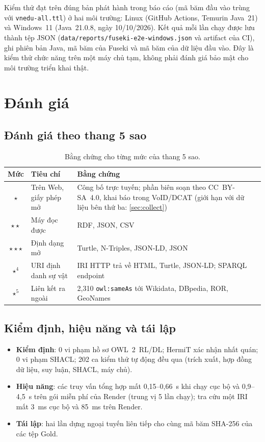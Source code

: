 \documentclass[12pt,a4paper]{article}
\begin{document}
Kiểm thử đạt trên đúng bản phát hành trong báo cáo (mã băm đầu vào trùng với \texttt{vnedu-all.ttl}) ở hai môi trường:
Linux (GitHub Actions, Temurin Java~21) và Windows~11 (Java~21.0.8, ngày 10/10/2026). Kết quả mỗi lần chạy được lưu thành
tệp JSON (\texttt{data/reports/fuseki-e2e-windows.json} và artifact của CI), ghi phiên bản Java, mã băm của Fuseki và mã
băm của dữ liệu đầu vào. Đây là kiểm thử chức năng trên một máy chủ tạm, không phải đánh giá bảo mật cho môi trường
triển khai thật.

\section{Đánh giá}\label{sec:eval}

\subsection{Đánh giá theo thang 5 sao}
\begin{table}[htbp]
\centering\small
\caption{Bằng chứng cho từng mức của thang 5 sao.}\label{tab:5star}
\begin{tabularx}{\textwidth}{c>{\raggedright\arraybackslash}p{3.4cm}X}
\toprule
Mức & Tiêu chí & Bằng chứng \\
\midrule
\(\star\) & Trên Web, giấy phép mở & Công bố trực tuyến; phần biên soạn theo CC~BY-SA~4.0, khai báo trong VoID/DCAT
(giới hạn với dữ liệu bên thứ ba: \cref{sec:collect}) \\
\(\star\star\) & Máy đọc được & RDF, JSON, CSV \\
\(\star\star\star\) & Định dạng mở & Turtle, N-Triples, JSON-LD, JSON \\
\(\star^4\) & URI định danh sự vật & \metricLocalResources{} IRI HTTP trả về HTML, Turtle, JSON-LD; SPARQL endpoint \\
\(\star^5\) & Liên kết ra ngoài & 2{,}310 \texttt{owl:sameAs} tới Wikidata, DBpedia, ROR, GeoNames \\
\bottomrule
\end{tabularx}
\end{table}

\subsection{Kiểm định, hiệu năng và tái lập}
\begin{itemize}
  \item \textbf{Kiểm định}: 0 vi phạm hồ sơ OWL~2~RL/DL; HermiT xác nhận nhất quán; 0 vi phạm SHACL; 202 ca kiểm thử tự
  động đều qua (trích xuất, hợp đồng dữ liệu, suy luận, SHACL, máy chủ).
  \item \textbf{Hiệu năng}: các truy vấn tổng hợp mất 0,15--0,66~s khi chạy cục bộ và 0,9--4,5~s trên gói miễn phí của
  Render (trung vị 5 lần chạy); tra cứu một IRI mất 3~ms cục bộ và 85~ms trên Render.
  \item \textbf{Tái lập}: hai lần dựng ngoại tuyến liên tiếp cho cùng mã băm SHA-256 của các tệp Gold.
\end{itemize}
\end{document}
